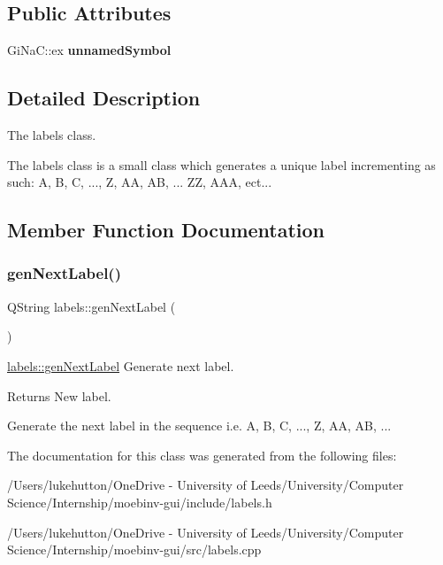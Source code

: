 \subsection*{Public Attributes}
\begin{DoxyCompactItemize}
\item 
\mbox{\label{classlabels_adec1585f4f5a3e449ce6e825717114af}} 
Gi\+Na\+C\+::ex {\bfseries unnamed\+Symbol}
\end{DoxyCompactItemize}


\subsection{Detailed Description}
The labels class. 

The labels class is a small class which generates a unique label incrementing as such\+: A, B, C, ..., Z, AA, AB, ... ZZ, A\+AA, ect... 

\subsection{Member Function Documentation}
\mbox{\label{classlabels_a70a7436dbef91e342fec4ec3130187e2}} 
\subsubsection{\texorpdfstring{gen\+Next\+Label()}{genNextLabel()}}
{\footnotesize\ttfamily Q\+String labels\+::gen\+Next\+Label (\begin{DoxyParamCaption}{ }\end{DoxyParamCaption})}



\mbox{\hyperlink{classlabels_a70a7436dbef91e342fec4ec3130187e2}{labels\+::gen\+Next\+Label}} Generate next label. 

\begin{DoxyReturn}{Returns}
New label.
\end{DoxyReturn}
Generate the next label in the sequence i.\+e. A, B, C, ..., Z, AA, AB, ... 

The documentation for this class was generated from the following files\+:\begin{DoxyCompactItemize}
\item 
/\+Users/lukehutton/\+One\+Drive -\/ University of Leeds/\+University/\+Computer Science/\+Internship/moebinv-\/gui/include/labels.\+h\item 
/\+Users/lukehutton/\+One\+Drive -\/ University of Leeds/\+University/\+Computer Science/\+Internship/moebinv-\/gui/src/labels.\+cpp\end{DoxyCompactItemize}
